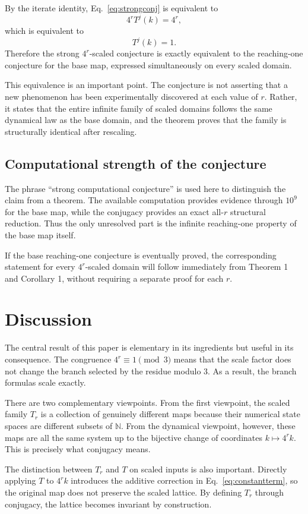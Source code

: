 \documentclass[11pt]{article}
\newcommand{\N}{\mathbb{N}}
\begin{document}
By the iterate identity, Eq.~\eqref{eq:strongconj} is equivalent to
\[
4^rT^j(k)=4^r,
\]
which is equivalent to
\[
T^j(k)=1.
\]
Therefore the strong $4^r$-scaled conjecture is exactly equivalent to the reaching-one conjecture for the base map, expressed simultaneously on every scaled domain.

This equivalence is an important point. The conjecture is not asserting that a new phenomenon has been experimentally discovered at each value of $r$. Rather, it states that the entire infinite family of scaled domains follows the same dynamical law as the base domain, and the theorem proves that the family is structurally identical after rescaling.

\subsection{Computational strength of the conjecture}
The phrase ``strong computational conjecture'' is used here to distinguish the claim from a theorem. The available computation provides evidence through $10^9$ for the base map, while the conjugacy provides an exact all-$r$ structural reduction. Thus the only unresolved part is the infinite reaching-one property of the base map itself.

If the base reaching-one conjecture is eventually proved, the corresponding statement for every $4^r$-scaled domain will follow immediately from Theorem 1 and Corollary 1, without requiring a separate proof for each $r$.

\section{Discussion}
The central result of this paper is elementary in its ingredients but useful in its consequence. The congruence $4^r\equiv1\pmod3$ means that the scale factor does not change the branch selected by the residue modulo $3$. As a result, the branch formulas scale exactly.

There are two complementary viewpoints. From the first viewpoint, the scaled family $T_r$ is a collection of genuinely different maps because their numerical state spaces are different subsets of $\N$. From the dynamical viewpoint, however, these maps are all the same system up to the bijective change of coordinates $k\mapsto4^rk$. This is precisely what conjugacy means.

The distinction between $T_r$ and $T$ on scaled inputs is also important. Directly applying $T$ to $4^rk$ introduces the additive correction in Eq.~\eqref{eq:constantterm}, so the original map does not preserve the scaled lattice. By defining $T_r$ through conjugacy, the lattice becomes invariant by construction.
\end{document}
